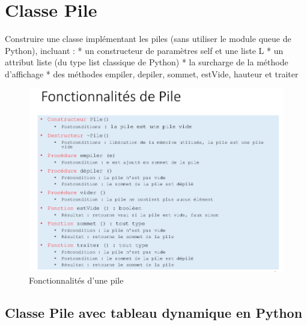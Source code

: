 \documentclass[11pt]{article}
\makeatletter
\def\maxwidth{\ifdim\Gin@nat@width>\linewidth\linewidth
    \else\Gin@nat@width\fi}
\let\Oldincludegraphics\includegraphics
\renewcommand{\includegraphics}[1]{\Oldincludegraphics[width=.8\maxwidth]{#1}}
\makeatother
\begin{document}
    \hypertarget{classe-pile}{%
\section{Classe Pile}\label{classe-pile}}

Construire une classe implémentant les piles (sans utiliser le module
queue de Python), incluant : * un constructeur de paramètres self et une
liste L * un attribut liste (du type list classique de Python) * la
surcharge de la méthode d'affichage * des méthodes empiler, depiler,
sommet, estVide, hauteur et traiter

\begin{figure}
\centering
\includegraphics{fonctionnalite_pile.png}
\caption{Fonctionnalités d'une pile}
\end{figure}

    \hypertarget{classe-pile-avec-tableau-dynamique-en-python}{%
\subsection{Classe Pile avec tableau dynamique en
Python}\label{classe-pile-avec-tableau-dynamique-en-python}}
\end{document}

